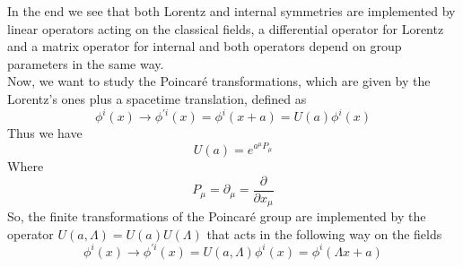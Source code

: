\documentclass[a4paper,10pt]{article}
\begin{document}
In the end we see that both Lorentz and internal symmetries are implemented by linear operators acting on the classical fields, a differential operator for Lorentz and a matrix
operator for internal and both operators depend on group parameters in the same way.\\
Now, we want to study the Poincaré transformations, which are given by the Lorentz's ones plus a spacetime translation, defined as
\begin{equation}
 \phi^i(x)\rightarrow\phi^{'i}(x)= \phi^i(x+a) = U(a) \phi^i(x)
\end{equation}
Thus we have
\begin{equation}
 U(a)=e^{a^\mu P_\mu}
\end{equation}
Where 
\begin{equation}
 P_\mu= \partial_\mu= \frac{\partial}{\partial x_\mu}
\end{equation}
So, the finite transformations of the Poincaré group are implemented by the operator 
 $U(a,\Lambda)=U(a)U(\Lambda)$
that acts in the following way on the fields
\begin{equation}
 \phi^i(x)\rightarrow\phi^{'i}(x)=U(a,\Lambda) \phi^i(x) =\phi^i(\Lambda x +a)
\end{equation}
\end{document}
